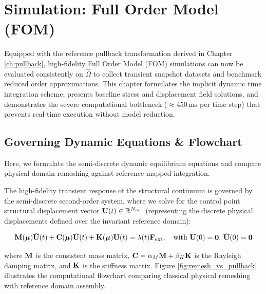 \chapter{Simulation: Full Order Model (FOM)}
\label{ch:fom}



Equipped with the reference pullback transformation derived in Chapter \ref{ch:pullback}, high-fidelity Full Order Model (FOM) simulations can now be evaluated consistently on $\hat{\Omega}$ to collect transient snapshot datasets and benchmark reduced order approximations. This chapter formulates the implicit dynamic time integration scheme, presents baseline stress and displacement field solutions, and demonstrates the severe computational bottleneck ($\approx 450\,\text{ms}$ per time step) that prevents real-time execution without model reduction.

\section{Governing Dynamic Equations \& Flowchart}

Here, we formulate the semi-discrete dynamic equilibrium equations and compare physical-domain remeshing against reference-mapped integration.

The high-fidelity transient response of the structural continuum is governed by the semi-discrete second-order system, where we solve for the control point structural displacement vector $\mathbf{U}(t) \in \mathbb{R}^{N_{\text{dof}}}$ (representing the discrete physical displacements defined over the invariant reference domain):

\begin{equation}
    \mathbf{M}(\boldsymbol{\mu}) \ddot{\mathbf{U}}(t) + \mathbf{C}(\boldsymbol{\mu}) \dot{\mathbf{U}}(t) + \mathbf{K}(\boldsymbol{\mu}) \mathbf{U}(t) = \lambda(t) \mathbf{F}_{\text{ext}}, \quad \text{with } \mathbf{U}(0) = \mathbf{0}, \, \dot{\mathbf{U}}(0) = \mathbf{0}
\end{equation}

where $\mathbf{M}$ is the consistent mass matrix, $\mathbf{C} = \alpha_M \mathbf{M} + \beta_K \mathbf{K}$ is the Rayleigh damping matrix, and $\mathbf{K}$ is the stiffness matrix. Figure \ref{fig:remesh_vs_pullback} illustrates the computational flowchart comparing classical physical remeshing with reference domain assembly.

